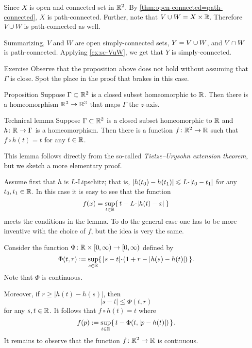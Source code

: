 Since $X$ is open and connected set in $\mathbb{R}^2$.
By \ref{thm:open-connected=path-connected}, $X$ is path-connected.
Further, note that $V\cup W=X\times \mathbb{R}$.
Therefore $V\cup W$ is path-connected as well.

Summarizing, $V$ and $W$ are open simply-connected sets, $Y=V\z\cup W$, and $V\z\cap W$ is path-connected.
Applying \ref{ex:sc-VuW}, we get that $Y$ is simply-connected.
\qeds

\begin{thm}{Exercise}
Observe that the proposition above does not hold without assuming that $\Gamma$ is close.
Spot the place in the proof that brakes in this case.
\end{thm}


\begin{thm}{Proposition}\label{prop:home-gamma-z-axis}
Suppose $\Gamma\subset\mathbb{R}^2$ is a closed subset homeomorphic to $\mathbb{R}$.
Then there is a homeomorphism $\mathbb{R}^3\to \mathbb{R}^3$ that maps $\Gamma$ the $z$-axis.
\end{thm}


\begin{thm}{Technical lemma}\label{lem:tietze}
Suppose $\Gamma\subset\mathbb{R}^2$ is a closed subset homeomorphic to $\mathbb{R}$ and $h\colon\mathbb{R}\to\Gamma$ is a homeomorphism.
Then there is a function $f\colon\mathbb{R}^2\to\mathbb{R}$ such that 
$f\circ h(t)=t$ for any $t\in \mathbb{R}$.
\end{thm}

This lemma follows directly from the so-called \emph{Tietze--Urysohn extension theorem},
but we sketch a more elementary proof.

Assume first that $h$ is $L$-Lipschitz;
that is, $|h(t_0)-h(t_1)|\le L\cdot |t_0\z-t_1|$ for any $t_0,t_1\in\mathbb{R}$.
In this case it is easy to see that the function 
\[f(x)=\sup_{t\in\RR}\{\, t-L\cdot |h(t)-x|\,\}\]
meets the conditions in the lemma.
To do the general case one has to be more inventive with the choice of $f$, but the idea is very the same.

Consider the function $\Phi\colon\mathbb{R}\times[0,\infty)\to[0,\infty)$ defined by 
\[\Phi(t,r)\df \sup_{s\in\RR} \{\,|s-t|\cdot (1+r-|h(s)-h(t)|)\,\}.\]
Note that $\Phi$ is continuous.

Moreover, if $r\ge |h(t)-h(s)|$, then
\[|s-t|\le \Phi(t,r)\]
for any $s,t\in\mathbb{R}$.
It follows that $f\circ h(t)=t$ where  
\[f(p)\mathrel{:=}\sup_{t\in\mathbb{R}}\{\,t-\Phi(t,|p-h(t)|)\,\}.\]
It remains to observe that the function $f\colon\mathbb{R}^2\to\mathbb{R}$ is continuous.
\qeds

